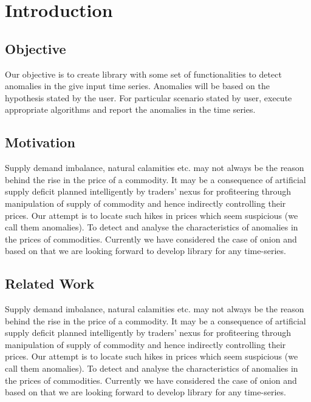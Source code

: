 \chapter{Introduction}


\section{Objective}

Our objective is to create library with some set of functionalities to detect anomalies in the give input time series​. Anomalies will be based on the hypothesis stated by the user​. For particular scenario stated by user, execute appropriate algorithms and report the anomalies in the time series.



\section{Motivation}

Supply demand imbalance, natural calamities etc. may not always be the reason behind the rise in the price of a commodity. ​It may be a consequence of artificial supply deficit planned intelligently by traders’ nexus for profiteering through manipulation of supply of commodity and hence indirectly controlling their prices. ​Our attempt is to locate such hikes in prices which seem suspicious (we call them anomalies).​ To detect and analyse the characteristics of anomalies in the prices of commodities. Currently we have considered the case of onion and based on that we are looking forward to develop library for any time-series.

\section{Related Work}

Supply demand imbalance, natural calamities etc. may not always be the reason behind the rise in the price of a commodity. ​It may be a consequence of artificial supply deficit planned intelligently by traders’ nexus for profiteering through manipulation of supply of commodity and hence indirectly controlling their prices. ​Our attempt is to locate such hikes in prices which seem suspicious (we call them anomalies).​ To detect and analyse the characteristics of anomalies in the prices of commodities. Currently we have considered the case of onion and based on that we are looking forward to develop library for any time-series.


